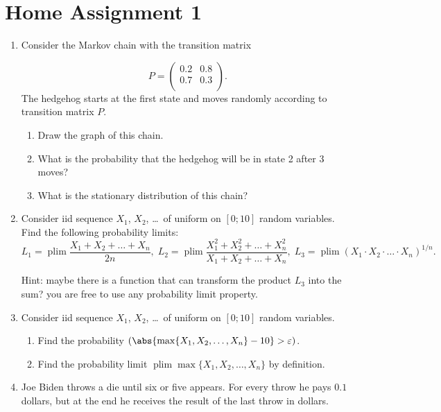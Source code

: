 \documentclass[12pt]{article}
\let\P\relax
\DeclareMathOperator{\P}{\mathbb{P}}
\DeclareMathOperator{\plim}{\mathrm{plim}}
\begin{document}
\section*{Home Assignment 1}
\begin{enumerate}

  \item Consider the Markov chain with the transition matrix
  
  \[
    P = \begin{pmatrix}
      0.2   & 0.8 \\
      0.7 & 0.3 \\
    \end{pmatrix}.
  \]
  The hedgehog starts at the first state and moves randomly according to transition matrix $P$.

  \begin{enumerate}
    \item Draw the graph of this chain. 
    \item What is the probability that the hedgehog will be in state 2 after 3 moves?
    \item What is the stationary distribution of this chain?
  \end{enumerate}

  \item Consider iid sequence $X_1$, $X_2$, \ldots~of uniform on $[0;10]$ random variables. 
  Find the following probability limits:
  \[
   L_1 = \plim \frac{X_1 + X_2 + \ldots + X_n}{2n}, \; L_2 = \plim \frac{X_1^2 + X_2^2 + \ldots + X_n^2}{X_1 + X_2 + \ldots + X_n}, \;
   L_3 = \plim (X_1 \cdot X_2 \cdot \ldots \cdot  X_n)^{1/n}.
  \]

   Hint: maybe there is a function that can transform the product $L_3$ into the sum? 
   you are free to use any probability limit property. 

   \item Consider iid sequence $X_1$, $X_2$, \ldots~of uniform on $[0;10]$ random variables. 
   \begin{enumerate}
     \item Find the probability $\P(\abs{\max\{X_1, X_2, \ldots, X_n\} - 10} > \varepsilon)$.
     \item Find the probability limit $\plim \max\{X_1, X_2, \ldots, X_n\}$ by definition. 
   \end{enumerate}
   
  \item Joe Biden throws a die until six or five appears.
  For every throw he pays $0.1$ dollars, but at the end he receives the result of the last throw in dollars.
  


\end{enumerate}
\end{document}
